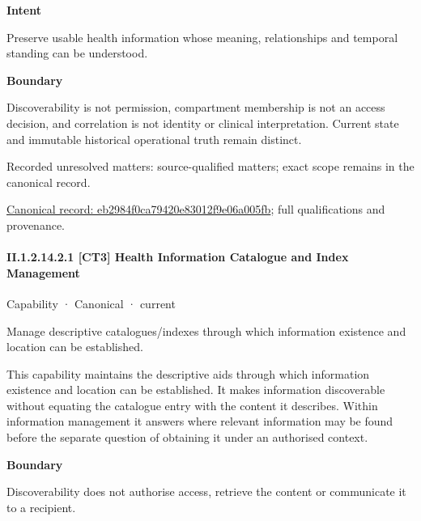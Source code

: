 \textbf{Intent}



Preserve usable health information whose meaning, relationships and temporal standing can be understood.



\textbf{Boundary}



Discoverability is not permission, compartment membership is not an access decision, and correlation is not identity or clinical interpretation. Current state and immutable historical operational truth remain distinct.


{\small Recorded unresolved matters: source-qualified matters; exact scope remains in the canonical record.}\par
{\footnotesize \href{../../../../continuum/strategy/capability/eb2984f0ca79420e83012f9e06a005fb.md}{Canonical record: eb2984f0ca79420e83012f9e06a005fb}; full qualifications and provenance.}\par
\paragraph*{II.1.2.14.2.1 [CT3] Health Information Catalogue and Index Management}
\label{navigation:II.1.2.14.2.1}

\label{element:4c834101307546d39a0ac36b07358faf}
{\small Capability · Canonical · current}\par

Manage descriptive catalogues/indexes through which information existence and location can be established.



This capability maintains the descriptive aids through which information existence and location can be established. It makes information discoverable without equating the catalogue entry with the content it describes. Within information management it answers where relevant information may be found before the separate question of obtaining it under an authorised context.



\textbf{Boundary}



Discoverability does not authorise access, retrieve the content or communicate it to a recipient.


